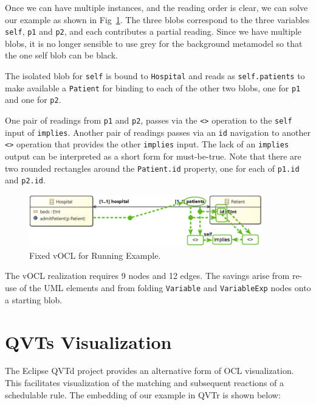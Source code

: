 \documentclass{llncs}
\begin{document}
Once we can have multiple instances, and the reading order is clear, we can solve our example as shown in Fig~\ref{fig:vOCLinv}. The three blobs correspond to the three variables \verb$self$, \verb$p1$ and \verb$p2$, and each contributes a partial reading. Since we have multiple blobs, it is no longer sensible to use grey for the background metamodel so that the one self blob can be black.

The isolated blob for \verb$self$ is bound to \verb$Hospital$ and reads as \verb$self.patients$ to make available a \verb$Patient$ for binding to each of the other two blobs, one for \verb$p1$ and one for \verb$p2$.

One pair of readings from \verb$p1$ and \verb$p2$, passes via the \verb$<>$ operation to the \verb$self$ input of \verb$implies$. Another pair of readings passes via an \verb$id$ navigation to another \verb$<>$ operation that provides the other \verb$implies$ input. The lack of an \verb$implies$ output can be interpreted as a short form for must-be-true. Note that there are two rounded rectangles around the \verb$Patient.id$ property, one for each of \verb$p1.id$ and \verb$p2.id$.

\begin{figure}
	\vspace{-10pt}
	\begin{center}
		\includegraphics[width=4.0in]{vOCLinv.png}
	\end{center}
	\vspace{-10pt}
	\vspace{-10pt}
	\caption{Fixed vOCL for Running Example.}
	\label{fig:vOCLinv}
	\vspace{-10pt}
\end{figure}

The vOCL realization requires 9 nodes and 12 edges. The savings arise from re-use of the UML elements and from folding \verb$Variable$ and \verb$VariableExp$ nodes onto a starting blob.

\section{QVTs Visualization}\label{QVTs}

The Eclipse QVTd project provides an alternative form of OCL visualization. This facilitates visualization of the matching and subsequent reactions of a schedulable rule. The embedding of our example in QVTr is shown below:
\end{document}
